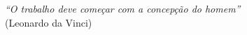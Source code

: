
\pretextualchapter{}
  \vspace*{\fill}
  \hspace{.45\textwidth}
  \begin{minipage}[b]{.5\textwidth}
    \begin{flushright}
      \textit{“O trabalho deve começar com a concepção do homem”}\\(Leonardo da Vinci)
    \end{flushright}
  \end{minipage}
